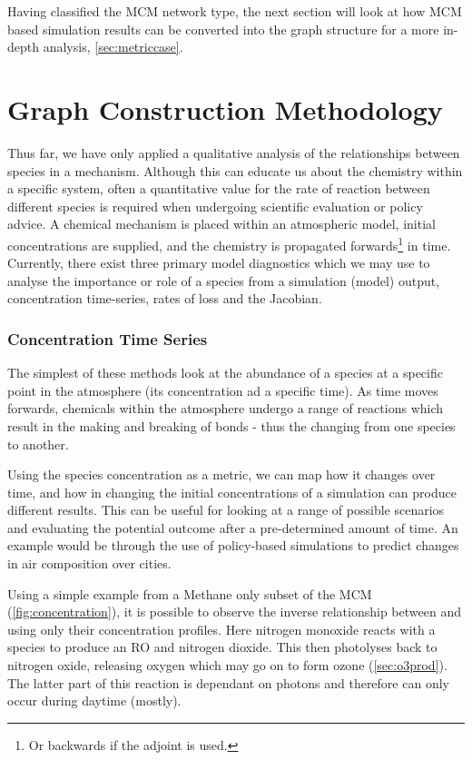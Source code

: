 Having classified the MCM network type, the next section will look at how MCM based simulation results can be converted into the graph structure for a more in-depth analysis, \autoref{sec:metriccase}.


\section{Graph Construction Methodology }\label{sec:chem}

Thus far, we have only applied a qualitative analysis of the relationships between species in a mechanism. Although this can educate us about the chemistry within a specific system, often a quantitative value for the rate of reaction between different species is required when undergoing scientific evaluation or policy advice. A chemical mechanism is placed within an atmospheric model, initial concentrations are supplied, and the chemistry is propagated forwards\footnote{Or backwards if the adjoint is used.} in time. Currently, there exist three primary model diagnostics which we may use to analyse the importance or role of a species from a simulation (model) output, concentration time-series, rates of loss and the Jacobian.


\subsubsection{Concentration Time Series}

The simplest of these methods look at the abundance of a  species at a specific point in the atmosphere (its concentration ad a specific time). As time moves forwards, chemicals within the atmosphere undergo a range of reactions which result in the making and breaking of bonds - thus the changing from one species to another.

Using the species concentration as a metric, we can map how it changes over time, and how in changing the initial concentrations of a simulation can produce different results. This can be useful for looking at a range of possible scenarios and evaluating the potential outcome after a pre-determined amount of time. An example would be through the use of policy-based simulations to predict changes in air composition over cities.

Using a simple example from a Methane only subset of the MCM (\autoref{fig:concentration}), it is possible to observe the inverse relationship between  and  using only their concentration profiles. Here nitrogen monoxide reacts with a  species to produce an RO and nitrogen dioxide.
This then photolyses back to nitrogen oxide, releasing oxygen which may go on to form ozone (\autoref{sec:o3prod}). The latter part of this reaction is dependant on photons and therefore can only occur during daytime (mostly).

